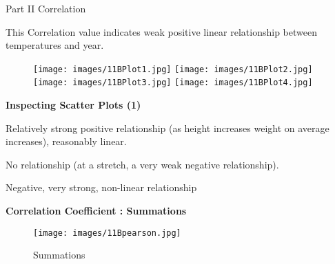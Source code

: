 \documentclass[]{report}
\begin{document}
Part II 	Correlation


This Correlation value indicates weak positive linear relationship between temperatures and year.





	






\begin{center}
\begin{figure}[h!]
	\texttt{[image: images/11BPlot1.jpg]} \texttt{[image: images/11BPlot2.jpg]}\\
	\texttt{[image: images/11BPlot3.jpg]} \texttt{[image: images/11BPlot4.jpg]}\\
	
	
\end{figure}
\end{center}
\textbf{Inspecting Scatter Plots (1) }

Relatively strong positive relationship (as height increases
weight on average increases), reasonably linear.



\begin{figure}[h!]
	
\end{figure}

No relationship (at a stretch, a very weak negative relationship).

%	
%	

Negative, very strong, non-linear relationship









\textbf{Correlation Coefficient : Summations}

\begin{figure}
	\texttt{[image: images/11Bpearson.jpg]}\\
	\caption{Summations}\label{11bpear}
\end{figure}
\end{document}

